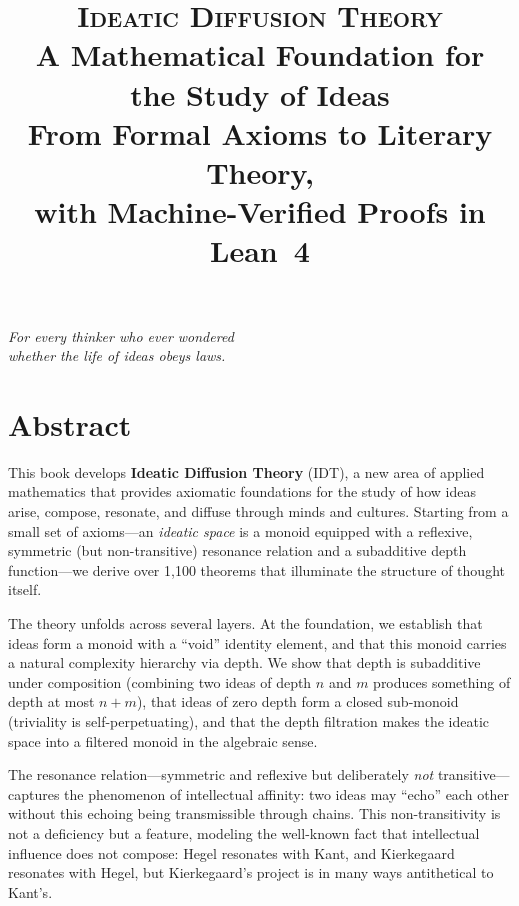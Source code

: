 \documentclass[11pt,openany]{book}
\title{%
  \vspace{-2cm}
  {\LARGE\scshape Ideatic Diffusion Theory}\\[0.5cm]
  {\Large A Mathematical Foundation for the Study of Ideas}\\[1cm]
  {\large From Formal Axioms to Literary Theory,\\
  with Machine-Verified Proofs in Lean~4}
}
\author{}
\date{}
\theoremstyle{definition}
\theoremstyle{plain}
\theoremstyle{remark}
\begin{document}
\frontmatter

\maketitle
\thispagestyle{empty}

\vfill
\begin{center}
\textit{For every thinker who ever wondered\\
whether the life of ideas obeys laws.}
\end{center}
\vfill

\clearpage

\chapter*{Abstract}

This book develops \textbf{Ideatic Diffusion Theory} (IDT), a new area of applied mathematics that provides axiomatic foundations for the study of how ideas arise, compose, resonate, and diffuse through minds and cultures. Starting from a small set of axioms---an \emph{ideatic space} is a monoid equipped with a reflexive, symmetric (but non-transitive) resonance relation and a subadditive depth function---we derive over 1,100 theorems that illuminate the structure of thought itself.

The theory unfolds across several layers. At the foundation, we establish that ideas form a monoid with a ``void'' identity element, and that this monoid carries a natural complexity hierarchy via depth. We show that depth is subadditive under composition (combining two ideas of depth $n$ and $m$ produces something of depth at most $n + m$), that ideas of zero depth form a closed sub-monoid (triviality is self-perpetuating), and that the depth filtration makes the ideatic space into a filtered monoid in the algebraic sense.

The resonance relation---symmetric and reflexive but deliberately \emph{not} transitive---captures the phenomenon of intellectual affinity: two ideas may ``echo'' each other without this echoing being transmissible through chains. This non-transitivity is not a deficiency but a feature, modeling the well-known fact that intellectual influence does not compose: Hegel resonates with Kant, and Kierkegaard resonates with Hegel, but Kierkegaard's project is in many ways antithetical to Kant's.
\end{document}
